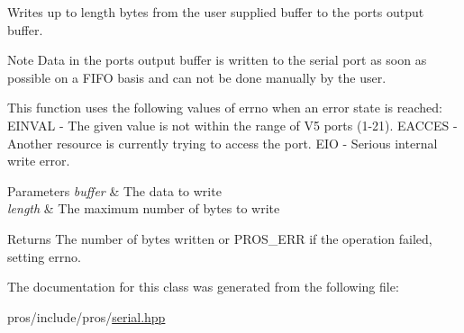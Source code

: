 Writes up to length bytes from the user supplied buffer to the port\textquotesingle{}s output buffer. 

\begin{DoxyNote}{Note}
Data in the port\textquotesingle{}s output buffer is written to the serial port as soon as possible on a F\+I\+FO basis and can not be done manually by the user.
\end{DoxyNote}
This function uses the following values of errno when an error state is reached\+: E\+I\+N\+V\+AL -\/ The given value is not within the range of V5 ports (1-\/21). E\+A\+C\+C\+ES -\/ Another resource is currently trying to access the port. E\+IO -\/ Serious internal write error.


\begin{DoxyParams}{Parameters}
{\em buffer} & The data to write \\
\hline
{\em length} & The maximum number of bytes to write\\
\hline
\end{DoxyParams}
\begin{DoxyReturn}{Returns}
The number of bytes written or P\+R\+O\+S\+\_\+\+E\+RR if the operation failed, setting errno. 
\end{DoxyReturn}


The documentation for this class was generated from the following file\+:\begin{DoxyCompactItemize}
\item 
pros/include/pros/\hyperlink{serial_8hpp}{serial.\+hpp}\end{DoxyCompactItemize}
